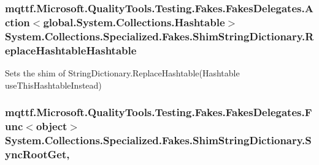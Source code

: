 \hypertarget{class_system_1_1_collections_1_1_specialized_1_1_fakes_1_1_shim_string_dictionary_ad2bcc782e4b9c2cd4ed33dc260beb745}{
\subsubsection[{Replace\-Hashtable\-Hashtable}]{\setlength{\rightskip}{0pt plus 5cm}mqttf.\-Microsoft.\-Quality\-Tools.\-Testing.\-Fakes.\-Fakes\-Delegates.\-Action$<$global.\-System.\-Collections.\-Hashtable$>$ System.\-Collections.\-Specialized.\-Fakes.\-Shim\-String\-Dictionary.\-Replace\-Hashtable\-Hashtable\hspace{0.3cm}{\ttfamily [set]}}}\label{class_system_1_1_collections_1_1_specialized_1_1_fakes_1_1_shim_string_dictionary_ad2bcc782e4b9c2cd4ed33dc260beb745}


Sets the shim of String\-Dictionary.\-Replace\-Hashtable(\-Hashtable use\-This\-Hashtable\-Instead)

\hypertarget{class_system_1_1_collections_1_1_specialized_1_1_fakes_1_1_shim_string_dictionary_a83daffaffea07a5b4a94a75198bc0433}{
\subsubsection[{Sync\-Root\-Get}]{\setlength{\rightskip}{0pt plus 5cm}mqttf.\-Microsoft.\-Quality\-Tools.\-Testing.\-Fakes.\-Fakes\-Delegates.\-Func$<$object$>$ System.\-Collections.\-Specialized.\-Fakes.\-Shim\-String\-Dictionary.\-Sync\-Root\-Get\hspace{0.3cm}{\ttfamily [get]}, {\ttfamily [set]}}}\label{class_system_1_1_collections_1_1_specialized_1_1_fakes_1_1_shim_string_dictionary_a83daffaffea07a5b4a94a75198bc0433}


